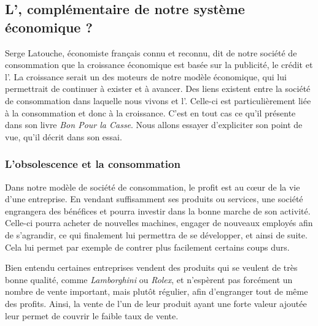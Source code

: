 \subsection{L'\OP, complémentaire de notre système\\ économique ?}

Serge Latouche, économiste français connu et reconnu, dit de notre société de consommation que la croissance économique est basée sur la publicité, le crédit et l'\op. La croissance serait un des moteurs de notre modèle économique, qui lui permettrait de continuer à exister et à avancer. Des liens existent entre la société de consommation dans laquelle nous vivons et l'\op. Celle-ci est particulièrement liée à la consommation et donc à la croissance. C'est en tout cas ce qu'il présente dans son livre \textit{Bon Pour la Casse}. Nous allons essayer d'expliciter son point de vue, qu'il décrit dans son essai.


\subsubsection{L'obsolescence et la consommation}
Dans notre modèle de société de consommation, le profit est au cœur de la vie d'une entreprise. En vendant suffisamment ses produits ou services, une société engrangera des bénéfices et pourra investir dans la bonne marche de son activité. Celle-ci pourra acheter de nouvelles machines, engager de nouveaux employés afin de s'agrandir, ce qui finalement lui permettra de se développer, et ainsi de suite. Cela lui permet par exemple de contrer plus facilement certains coups durs.

Bien entendu certaines entreprises vendent des produits qui se veulent de très bonne qualité, comme \textit{Lamborghini} ou \textit{Rolex}, et n'espèrent pas forcément un nombre de vente important, mais plutôt régulier, afin d'engranger tout de même des profits. Ainsi, la vente de l'un de leur produit ayant une forte valeur ajoutée leur permet de couvrir le faible taux de vente.


